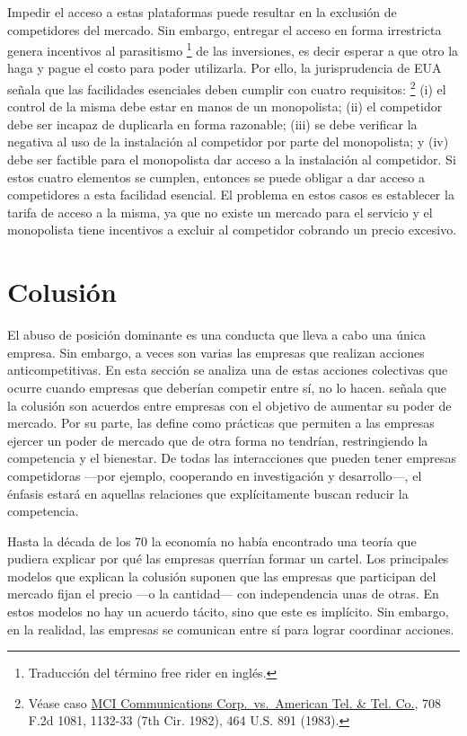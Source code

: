 \documentclass[
  12pt,
  spanish,
]{book}
\begin{document}
Impedir el acceso a estas plataformas puede resultar en la exclusión de competidores del mercado. Sin embargo, entregar el acceso en forma irrestricta genera incentivos al parasitismo
\footnote{Traducción del término free rider en inglés.}
de las inversiones, es decir esperar a que otro la haga y pague el costo para poder utilizarla. Por ello, la jurisprudencia de EUA señala que las facilidades esenciales deben cumplir con cuatro requisitos:
\footnote{Véase caso \href{https://law.justia.com/cases/federal/appellate-courts/F2/708/1081/330445/}{MCI Communications Corp.~vs.~American Tel. \& Tel. Co.}, 708 F.2d 1081, 1132-33 (7th Cir. 1982), 464 U.S. 891 (1983).}
(i) el control de la misma debe estar en manos de un monopolista; (ii) el competidor debe ser incapaz de duplicarla en forma razonable; (iii) se debe verificar la negativa al uso de la instalación al competidor por parte del monopolista; y (iv) debe ser factible para el monopolista dar acceso a la instalación al competidor. Si estos cuatro elementos se cumplen, entonces se puede obligar a dar acceso a competidores a esta facilidad esencial. El problema en estos casos es establecer la tarifa de acceso a la misma, ya que no existe un mercado para el servicio y el monopolista tiene incentivos a excluir al competidor cobrando un precio excesivo.

\hypertarget{colusiuxf3n}{%
\section{Colusión}\label{colusiuxf3n}}

El abuso de posición dominante es una conducta que lleva a cabo una única empresa. Sin embargo, a veces son varias las empresas que realizan acciones anticompetitivas. En esta sección se analiza una de estas acciones colectivas que ocurre cuando empresas que deberían competir entre sí, no lo hacen. \citet{Cabral2017} señala que la colusión son acuerdos entre empresas con el objetivo de aumentar su poder de mercado. Por su parte, \citet{Motta2004} las define como prácticas que permiten a las empresas ejercer un poder de mercado que de otra forma no tendrían, restringiendo la competencia y el bienestar. De todas las interacciones que pueden tener empresas competidoras ---por ejemplo, cooperando en investigación y desarrollo---, el énfasis estará en aquellas relaciones que explícitamente buscan reducir la competencia.

Hasta la década de los 70 la economía no había encontrado una teoría que pudiera explicar por qué las empresas querrían formar un cartel. Los principales modelos que explican la colusión suponen que las empresas que participan del mercado fijan el precio ---o la cantidad--- con independencia unas de otras. En estos modelos no hay un acuerdo tácito, sino que este es implícito. Sin embargo, en la realidad, las empresas se comunican entre sí para lograr coordinar acciones.
\end{document}
